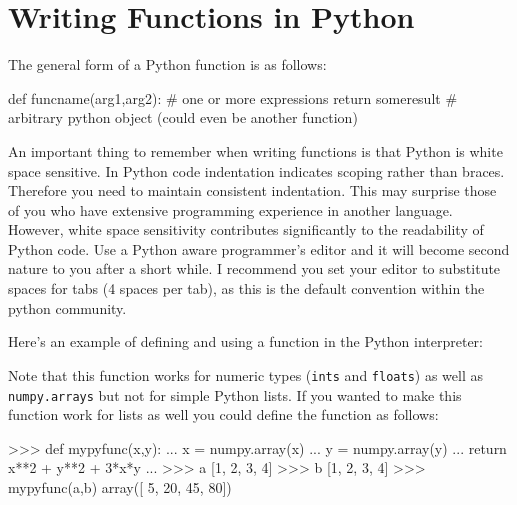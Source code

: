 \section{Writing Functions in Python}

The general form of a Python function is as follows:
%
\begin{python}
def funcname(arg1,arg2):
    # one or more expressions
    return someresult # arbitrary python object (could even be another function)
\end{python}
%
An important thing to remember when writing functions is that Python is
white space sensitive. In Python code indentation indicates scoping
rather than braces. Therefore you need to maintain consistent
indentation. This may surprise those of you who have extensive
programming experience in another language. However, white space
sensitivity contributes significantly to the readability of Python code.
Use a Python aware programmer's editor and it will become second nature
to you after a short while. I recommend you set your editor to
substitute spaces for tabs (4 spaces per tab), as this is the default
convention within the python community.

Here's an example of defining and using a function in the Python
interpreter:
%
%
Note that this function works for numeric types (\lstinline!ints! and
\lstinline!floats!) as well as \lstinline!numpy.arrays! but not for
simple Python lists. If you wanted to make this function work for lists
as well you could define the function as follows:
%
\begin{python}
>>> def mypyfunc(x,y):
...     x = numpy.array(x)
...     y = numpy.array(y)
...     return x**2 + y**2 + 3*x*y
... 
>>> a
[1, 2, 3, 4]
>>> b
[1, 2, 3, 4]
>>> mypyfunc(a,b)
array([ 5, 20, 45, 80])
\end{python}


